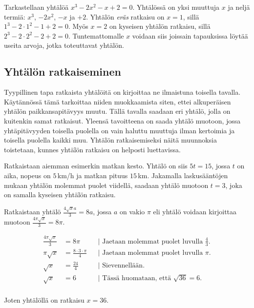\begin{esimerkki}
Tarkastellaan yhtälöä $x^3-2x^2-x+2=0$. Yhtälössä on yksi muuttuja $x$ ja neljä termiä: $x^3$, $-2x^2$, $-x$ ja $+2$. Yhtälön \textit{eräs} ratkaisu on $x=1$, sillä $1^3-2\cdot{1^2}-1+2=0$. Myös $x=2$ on kyseisen yhtälön ratkaisu, sillä $2^3-2\cdot{2^2}-2+2=0$. Tuntemattomalle $x$ voidaan siis joissain tapauksissa löytää useita arvoja, jotka toteuttavat yhtälön. 
\end{esimerkki}

\subsection{Yhtälön ratkaiseminen}

Tyypillinen tapa ratkaista yhtälöitä on kirjoittaa ne ilmaistuna toisella tavalla. Käytännössä tämä tarkoittaa niiden muokkaamista siten, ettei alkuperäisen yhtälön paikkansapitävyys muutu. Tällä tavalla saadaan eri yhtälö, jolla on kuitenkin samat ratkaisut. Yleensä tavoitteena on saada yhtälö muotoon, jossa yhtäpitävyyden toisella puolella on vain haluttu muuttuja ilman kertoimia ja toisella puolella kaikki muu.  Yhtälön ratkaisemiseksi näitä muunnoksia toistetaan, kunnes yhtälön ratkaisu on helposti luettavissa.

\begin{esimerkki} %
Ratkaistaan aiemman esimerkin matkan kesto. Yhtälö on siis $5t=15$, jossa $t$ on aika, nopeus on $5$\,km/h ja matkan pituus $15$\,km. Jakamalla laskusääntöjen mukaan yhtälön molemmat puolet viidellä, saadaan yhtälö muotoon $t=3$, joka on samalla kyseisen yhtälön ratkaisu.
\end{esimerkki}

\begin{esimerkki}
Ratkaistaan yhtälö $\frac{4\sqrt{x}a}{3}=8a$, jossa $a$ on vakio $\pi$ eli yhtälö voidaan kirjoittaa muotoon $\frac{4\pi\sqrt{x}}{3}=8\pi$.

		\begin{align*}
			\frac{4 \pi \sqrt{x}}{3} &= 8 {\pi} && \text{| Jaetaan molemmat puolet luvulla $\frac{4}{3}$.} \\
			{\pi}\sqrt{x} &= \frac{8\cdot 3\cdot {\pi}}{4} && \text{| Jaetaan molemmat puolet luvulla $\pi$.} \\
			\sqrt{x} &= \frac{24}{4} && \text{| Sievennellään.} \\
			\sqrt{x} &= 6 && \text{| Tässä huomataan, että $\sqrt{36}=6$.} \\
\end{align*}

Joten yhtälöllä on ratkaisu $x=36$.

\end{esimerkki}

